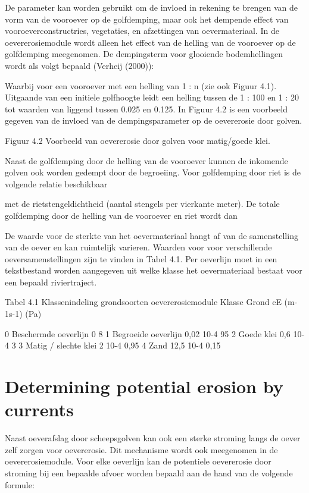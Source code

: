 De parameter   kan worden gebruikt om de invloed in rekening te brengen van de vorm van de vooroever op de golfdemping, maar ook het dempende effect van vooroeverconstructries, vegetaties, en afzettingen van oevermateriaal.
In de oevererosiemodule wordt alleen het effect van de helling van de vooroever op de golfdemping meegenomen.
De dempingsterm voor glooiende bodemhellingen wordt als volgt bepaald (Verheij (2000)):

	
Waarbij   voor een vooroever met een helling van 1 : n (zie ook Figuur 4.1).
Uitgaande van een initiele golfhoogte   leidt een helling tussen de 1 : 100 en 1 : 20 tot waarden van   liggend tussen 0.025 en 0.125.
In Figuur 4.2 is een voorbeeld gegeven van de invloed van de dempingsparameter   op de oevererosie door golven.

Figuur 4.2 Voorbeeld van oevererosie door golven voor matig/goede klei.



Naast de golfdemping door de helling van de vooroever kunnen de inkomende golven ook worden gedempt door de begroeiing.
Voor golfdemping door riet is de volgende relatie beschikbaar
	
met   de rietstengeldichtheid (aantal stengels per vierkante meter).
De totale golfdemping door de helling van de vooroever en riet wordt dan
	

De waarde voor de sterkte van het oevermateriaal   hangt af van de samenstelling van de oever en kan ruimtelijk varieren.
Waarden voor   voor verschillende oeversamenstellingen zijn te vinden in Tabel 4.1.
Per oeverlijn moet in een tekstbestand worden aangegeven uit welke klasse het oevermateriaal bestaat voor een bepaald riviertraject.

Tabel 4.1 Klassenindeling grondsoorten oevererosiemodule
Klasse	Grond	cE (m-1s-1)	  (Pa)

0	Beschermde oeverlijn	0	8
1	Begroeide oeverlijn	0,02 10-4	95
2	Goede klei	0,6 10-4	3
3	Matig / slechte klei 	2 10-4	0,95
4	Zand	12,5 10-4	0,15

\section{Determining potential erosion by currents}

Naast oeverafslag door scheepsgolven kan ook een sterke stroming langs de oever zelf zorgen voor oevererosie.
Dit mechanisme wordt ook meegenomen in de oevererosiemodule.
Voor elke oeverlijn kan de potentiele oevererosie door stroming bij een bepaalde afvoer   worden bepaald aan de hand van de volgende formule:
	
